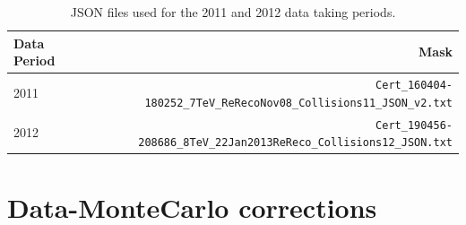 \begin{table}[hbth]
\centering
\begin{tabular}{lr}
\hline
\textbf{Data Period} & \textbf{Mask} \\
\hline
2011 & \verb|Cert_160404-180252_7TeV_ReRecoNov08_Collisions11_JSON_v2.txt| \\
2012 & \verb|Cert_190456-208686_8TeV_22Jan2013ReReco_Collisions12_JSON.txt| \\
\hline
\end{tabular}
\caption{JSON files used for the 2011 and 2012 data taking periods.}
\label{tab:JSONfiles}
\end{table}

\section{Data-MonteCarlo corrections}
\label{as:data_monte_carlo_corrections}
